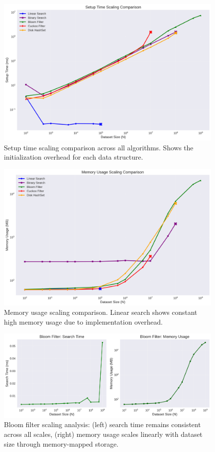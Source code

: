 \documentclass[sigconf]{acmart}
\begin{document}
\begin{figure}[h]
\centering
\includegraphics[width=0.95\linewidth]{setup-time-scaling}
\caption{Setup time scaling comparison across all algorithms. Shows the initialization overhead for each data structure.}
\label{fig:setup-time-scaling}
\end{figure}

\begin{figure}[h]
\centering
\includegraphics[width=0.95\linewidth]{memory-usage-scaling}
\caption{Memory usage scaling comparison. Linear search shows constant high memory usage due to implementation overhead.}
\label{fig:memory-usage-scaling}
\end{figure}

\begin{figure}[h]
\centering
\includegraphics[width=0.95\linewidth]{bloom-filter-scaling}
\caption{Bloom filter scaling analysis: (left) search time remains consistent across all scales, (right) memory usage scales linearly with dataset size through memory-mapped storage.}
\label{fig:bloom-scaling}
\end{figure}
\end{document}
